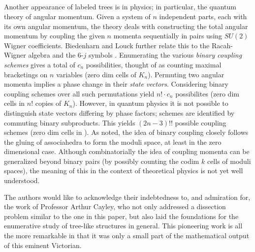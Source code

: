 \documentclass[10pt]{amsart}
\begin{document}
            \subsection{}
            Another appearance of labeled trees is in physics; in particular, the quantum theory of angular momentum. Given a system of $n$ independent parts, each with its own angular momentum, the theory deals with constructing the total angular momentum by coupling the given $n$ momenta sequentially in pairs using $SU(2)$ Wigner coefficients. Biedenharn and Louck further relate this to the Racah-Wigner algebra and the 6-$j$ symbols \cite[\S5]{racah}. Enumerating the various {\em binary coupling schemes} gives a total of $c_n$ possibilities, thought of as counting maximal bracketings on $n$ variables (zero dim cells of $K_n$). Permuting two angular momenta implies a phase change in their {\em state vectors}.  Considering  binary coupling schemes over all such permutations  yield $n! \cdot c_n$ possibilites (zero dim cells in $n!$ copies of $K_n$).  However, in quantum physics it is not possible to distinguish state vectors differing by phase factors; schemes are identified by commuting binary subproducts. This yields $(2n-3)!!$ possible coupling schemes (zero dim cells in ).  As noted, the idea of binary coupling closely follows the gluing of associahedra to form the moduli space, at least in the zero dimensional case.  Although combinatorially the idea of coupling momenta can be generalized beyond binary pairs (by possibly counting the codim $k$ cells of moduli spaces), the meaning of this in the context of theoretical physics is not yet well understood.
            
            
            \vspace{.5in}
            
            {\small
            \begin{ack}
            The authors would like to acknowledge their indebtedness to, and admiration for, the work of Professor Arthur Cayley, who not only addressed a dissection problem similar to the one in this paper, but also laid the foundations for the enumerative study of tree-like structures in general.   This pioneering work is all the more remarkable in that it was only a small part of the mathematical output of this eminent Victorian.
            \end{ack}}
            
\end{document}
